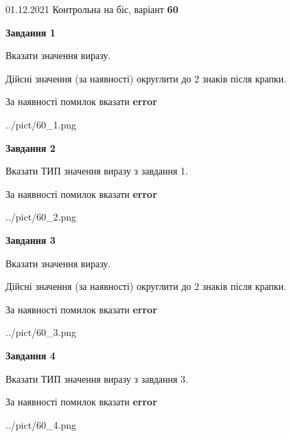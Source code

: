 \documentclass[11pt, ukrainian]{article}
\begin{document}
{01.12.2021 Контрольна на біс, варіант  \No \textbf { 60 }\par}
{
\begin {large}
{\begin {center}\textbf{Завдання 1}\end {center}}\par
Вказати значення виразу. \par
Дійсні значення (за наявності) округлити до 2 знаків після крапки. \par
За наявності помилок вказати \textbf{error}

\begin{center}
	{../pict/60_1.png}
\end{center}
\newpage

{\begin {center}\textbf{Завдання 2}\end {center}}\par
Вказати ТИП значення виразу з завдання 1. \par
За наявності помилок вказати \textbf{error}

\begin{center}
	{../pict/60_2.png}
\end{center}
\newpage

{\begin {center}\textbf{Завдання 3}\end {center}}\par
Вказати значення виразу. \par
Дійсні значення (за наявності) округлити до 2 знаків після крапки. \par
За наявності помилок вказати \textbf{error}

\begin{center}
	{../pict/60_3.png}
\end{center}
\newpage

{\begin {center}\textbf{Завдання 4}\end {center}}\par
Вказати ТИП значення виразу з завдання 3. \par
За наявності помилок вказати \textbf{error}

\begin{center}
	{../pict/60_4.png}
\end{center}
\newpage


\end{large}}
\end{document}
